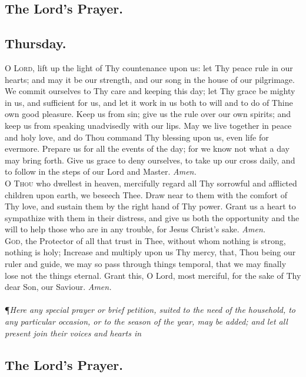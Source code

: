 \subsection*{The Lord's Prayer.}

\subsection*{Thursday.}

\lettrine{O}{ Lord,} lift up the light of Thy countenance upon us:
let Thy peace rule in our hearts; and may it be our
strength, and our song in the house of our pilgrimage.
We commit ourselves to Thy care and keeping this day;
let Thy grace be mighty in us, and sufficient for us, and
let it work in us both to will and to do of Thine own
good pleasure. Keep us from sin; give us the rule over
our own spirits; and keep us from speaking unadvisedly
with our lips. May we live together in peace and holy love,
and do Thou command Thy blessing upon us, even life for
evermore. Prepare us for all the events of the day; for
we know not what a day may bring forth. Give us grace
to deny ourselves, to take up our cross daily, and to follow
in the steps of our Lord and Master.
\textit{Amen.} \\

\lettrine{O}{ Thou} who dwellest in heaven, mercifully regard all
Thy sorrowful and afflicted children upon earth, we
beseech Thee. Draw near to them with the comfort of
Thy love, and sustain them by the right hand of Thy
power. Grant us a heart to sympathize with them in
their distress, and give us both the opportunity and the
will to help those who are in any trouble, for Jesus Christ’s
sake.
\textit{Amen.} \\

\lettrine{G}{od,} the Protector of all that trust in Thee, without
whom nothing is strong, nothing is holy; Increase and
multiply upon us Thy mercy, that, Thou being our ruler
and guide, we may so pass through things temporal, that
we may finally lose not the things eternal. Grant this, O
Lord, most merciful, for the sake of Thy dear Son, our
Saviour.
\textit{Amen.} \\ \\

\noindent\P\textit{Here any special prayer or brief petition, suited to the need of the household, to any particular occasion, or to the season of the
year, may be added; and let all present join their voices and
hearts in}

\subsection*{The Lord's Prayer.}

